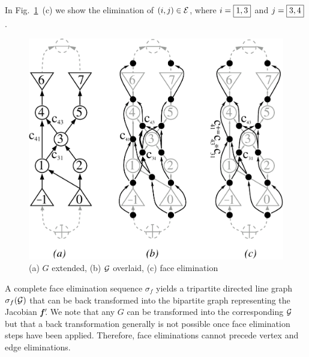 \documentclass[11pt]{article}
\newcommand{\bmfp}{\mbox{\bf\em f$\,^\prime\!\!$}}
\newcommand{\reffig}[1]{{Fig.~\ref{#1}}}
\begin{document}
In \reffig{fig:face_elims}~(c) we show the elimination of $(i,j) \in \cal E$,
where $i=\framebox{$1,3$}$ and $j=\framebox{$3,4$}$.

\begin{figure}
\centering\includegraphics[width=.65\textwidth]{face_elims}
\caption{
(a) $G$ extended, 
(b) $\cal G$ overlaid, 
(c) face elimination 
}
\label{fig:face_elims}
\end{figure}
A complete face elimination sequence $\sigma_f$ yields a tripartite 
directed line graph $\sigma_f({\cal G})$ that can be back transformed into 
the bipartite graph representing the Jacobian $\bmfp$.
We note that any $G$ can be transformed into the 
corresponding $\cal G$ but that a back transformation 
generally is not  possible once face elimination steps have been applied. 
Therefore, face eliminations cannot precede vertex and edge 
eliminations.
\end{document}
